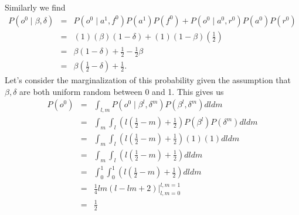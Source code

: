 \documentclass{amsart}
\theoremstyle{definition}
\theoremstyle{plain}
\numberwithin{equation}{section}
\begin{document}
Similarly we find%
\begin{eqnarray*}
P\left( o^{0}\mid \beta ,\delta \right)  &=&P\left( o^{0}\mid
a^{1},f^{0}\right) P\left( a^{1}\right) P\left( f^{0}\right) +P\left(
o^{0}\mid a^{0},r^{0}\right) P\left( a^{0}\right) P\left( r^{0}\right)  \\
&=&\left( 1\right) \left( \beta \right) \left( 1-\delta \right) +\left(
1\right) \left( 1-\beta \right) \left( \frac{1}{2}\right)  \\
&=&\beta \left( 1-\delta \right) +\frac{1}{2}-\frac{1}{2}\beta  \\
&=&\beta \left( \frac{1}{2}-\delta \right) +\frac{1}{2}.
\end{eqnarray*}%
Let's consider the marginalization of this probability given the assumption
that $\beta ,\delta $ are both uniform random between 0 and 1. This gives us 
\begin{eqnarray*}
P\left( o^{0}\right)  &=&\int_{l,m}P\left( o^{0}\mid \beta ^{l},\delta
^{m}\right) P\left( \beta ^{l},\delta ^{m}\right) dldm \\
&=&\int_{m}\int_{l}\left( l\left( \frac{1}{2}-m\right) +\frac{1}{2}\right)
P\left( \beta ^{l}\right) P\left( \delta ^{m}\right) dldm \\
&=&\int_{m}\int_{l}\left( l\left( \frac{1}{2}-m\right) +\frac{1}{2}\right)
\left( 1\right) \left( 1\right) dldm \\
&=&\int_{m}\int_{l}\left( l\left( \frac{1}{2}-m\right) +\frac{1}{2}\right)
dldm \\
&=&\int_{0}^{1}\int_{0}^{1}\left( l\left( \frac{1}{2}-m\right) +\frac{1}{2}%
\right) dldm \\
&=&\frac{1}{4}lm\left( l-lm+2\right) |_{l,m=0}^{l,m=1} \\
&=&\frac{1}{2}
\end{eqnarray*}
\end{document}
